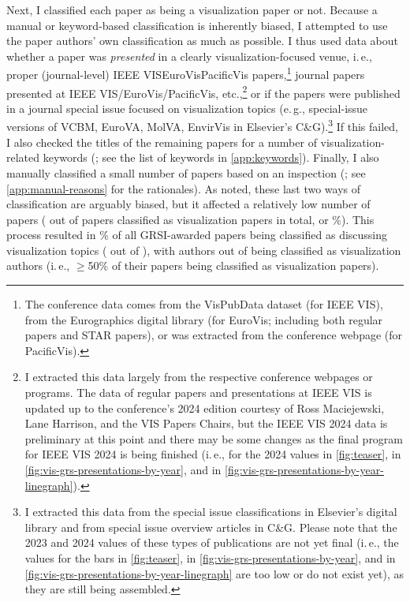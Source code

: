 \documentclass[conference,svgnames]{vgtc}                     %
\newcommand{\eg}{e.\,g.}
\newcommand{\ie}{i.\,e.}
\begin{document}
Next, I classified each paper as being a visualization paper or not. Because a manual or keyword-based classification is inherently biased, I attempted to use the paper authors' own classification as much as possible. I thus used data about whether a paper was \emph{presented} in a clearly visualization-focused venue, \ie, proper (journal-level) IEEE VIS\discretionary{/}{}{/}Euro\-Vis\discretionary{/}{}{/}Paci\-fic\-Vis papers,\footnote{The conference data comes from the VisPubData dataset \cite{Isenberg:2017:VMC} (for IEEE VIS), from the Eurographics digital library (for EuroVis; including both regular papers and STAR papers), or was extracted from the conference webpage (for PacificVis).} journal papers presented at IEEE VIS/EuroVis/PacificVis, etc.,\footnote{\label{foot:vis_presentations}I extracted this data largely from the respective conference webpages or programs. The data of regular papers and presentations at IEEE VIS is updated up to the conference's 2024 edition courtesy of Ross Maciejewski, Lane Harrison, and the VIS Papers Chairs, but the IEEE VIS 2024 data is preliminary at this point and there may be some changes as the final program for IEEE VIS 2024 is being finished (\ie, for the 2024 values in \autoref{fig:teaser}, in \autoref{fig:vis-grs-presentations-by-year}, and in \autoref{fig:vis-grs-presentations-by-year-linegraph}).} or if the papers were published in a journal special issue focused on visualization topics (\eg, special-issue versions of VCBM, EuroVA, MolVA, EnvirVis in Elsevier's C\&G).\footnote{\label{foot:c-and-g-special}I extracted this data from the special issue classifications in Elsevier's digital library and from special issue overview articles in C\&G. Please note that the 2023 and 2024 values of these types of publications are not yet final (\ie, the values for the bars in \autoref{fig:teaser}, in \autoref{fig:vis-grs-presentations-by-year}, and in \autoref{fig:vis-grs-presentations-by-year-linegraph} are too low or do not exist yet), as they are still being assembled.} If this failed, I also checked the titles of the remaining papers for a number of visualization-related keywords (\GrsiVisByKeywordPapersCount{}\texttimes; see the list of keywords in \autoref{app:keywords}). Finally, I also manually classified a small number of papers based on an inspection (\GrsiVisManuallyMarkedPapersCount{}\texttimes; see \autoref{app:manual-reasons} for the rationales). As noted, these last two ways of classification are arguably biased, but it affected a relatively low number of papers (\GrsiVisKeywordPlusManualPapersCount{} out of \GrsiTotalVisPapers{} papers classified as visualization papers in total, or \GrsiVisKeywordPlusManualPapersPercentage{}\%). This process resulted in \GrsiPercentageVisPapers{}\% of all GRSI-awarded papers being classified as discussing visualization topics (\GrsiTotalVisPapers{} out of \GrsiTotalPapers{}), with \GrsiTotalVisAuthors{} authors out of \GrsiTotalAuthors{} being classified as visualization authors (\ie, $\geq$50\% of their papers being classified as visualization papers).
\end{document}
